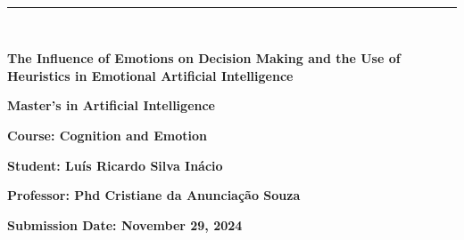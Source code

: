\documentclass[a4paper,12pt]{report}
\begin{document}
	
	\begin{titlepage}
		\centering
		\vspace*{-2cm} %
		
		\hfill%
		\\[0.5cm]
		
		\noindent
		{\color{barraazul}\rule{\textwidth}{1mm}} %
		\\[1cm]
		
		{\LARGE \textbf{The Influence of Emotions on Decision Making and the Use of Heuristics in Emotional Artificial Intelligence} \par}
		\vspace{1.5cm}
		
		{\Large \textbf{Master's in Artificial Intelligence}} \par
		\vspace{1cm}
		
		{\large \textbf{Course: Cognition and Emotion}} \par
		\vspace{3cm}

		{\large \textbf{Student: Luís Ricardo Silva Inácio}} \par

				
		\vspace{3cm}
		
		{\large \textbf{Professor: Phd Cristiane da Anunciação Souza}} \par
		\vfill
		
		\vspace{0.5cm}
		{\large \textbf{Submission Date: November 29, 2024}} \par
	\end{titlepage}
	
\end{document}
